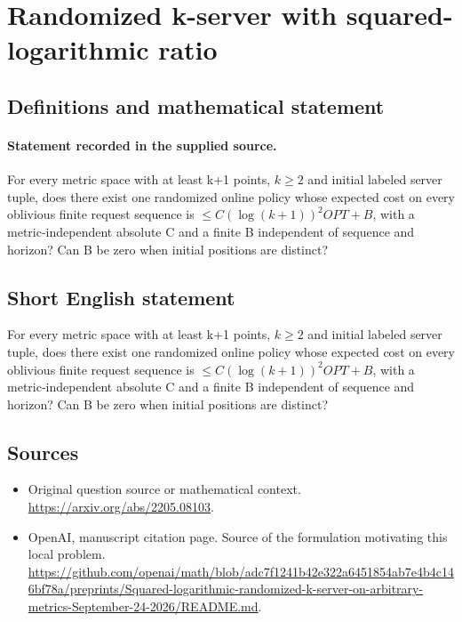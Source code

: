 \documentclass[11pt]{article}
\begin{document}
\section*{Randomized k-server with squared-logarithmic ratio}\label{statement}
\subsection{Definitions and mathematical statement}
\paragraph{Statement recorded in the supplied source.}
For every metric space with at least k+1 points, $k\geq 2$ and initial labeled server tuple, does there exist one randomized online policy whose expected cost on every oblivious finite request sequence is $\leq C(\log (k+1))^{2}OPT+B$, with a metric-independent absolute C and a finite B independent of sequence and horizon? Can B be zero when initial positions are distinct?
\subsection{Short English statement}
For every metric space with at least k+1 points, $k\geq 2$ and initial labeled server tuple, does there exist one randomized online policy whose expected cost on every oblivious finite request sequence is $\leq C(\log (k+1))^{2}OPT+B$, with a metric-independent absolute C and a finite B independent of sequence and horizon? Can B be zero when initial positions are distinct?
\subsection{Sources}
\begin{itemize}
\item[S1] Original question source or mathematical context.
\url{https://arxiv.org/abs/2205.08103}.
\item[S2] OpenAI, manuscript citation page. Source of the formulation motivating this local problem.
\url{https://github.com/openai/math/blob/adc7f1241b42e322a6451854ab7e4b4c146bf78a/preprints/Squared-logarithmic-randomized-k-server-on-arbitrary-metrics-September-24-2026/README.md}.
\end{itemize}
\end{document}
